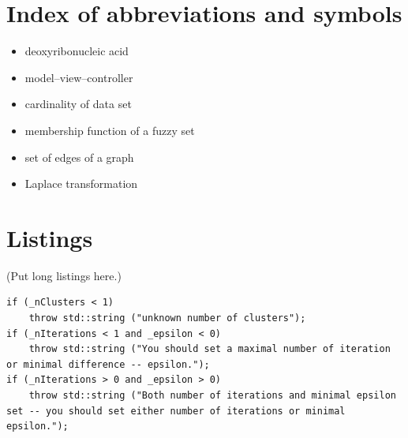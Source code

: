 \documentclass[a4paper,twoside,12pt]{book}
\begin{document}
\begin{appendices}	


\chapter{Index of abbreviations and symbols}

\begin{itemize}
\item[DNA] deoxyribonucleic acid
\item[MVC] model--view--controller 
\item[$N$] cardinality of data set
\item[$\mu$] membership function of a fuzzy set
\item[$\mathbb{E}$] set of edges of a graph
\item[$\mathcal{L}$] Laplace transformation
\end{itemize}


\chapter{Listings}

(Put long listings here.)

\begin{lstlisting}
if (_nClusters < 1)
	throw std::string ("unknown number of clusters");
if (_nIterations < 1 and _epsilon < 0)
	throw std::string ("You should set a maximal number of iteration or minimal difference -- epsilon.");
if (_nIterations > 0 and _epsilon > 0)
	throw std::string ("Both number of iterations and minimal epsilon set -- you should set either number of iterations or minimal epsilon.");
\end{lstlisting}





\end{appendices}
\end{document}
